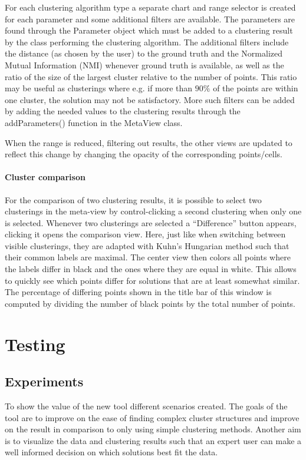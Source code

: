 \documentclass[
	a4paper,
	english,
	twoside,
	openright,               
	11pt                            
	]{report}
\begin{document}
For each clustering algorithm type a separate chart and range selector is created for each parameter and some additional filters are available. The parameters are found through the Parameter object which must be added to a clustering result by the class performing the clustering algorithm. The additional filters include the distance (as chosen by the user) to the ground truth and the Normalized Mutual Information (NMI) \cite{10.5555/1756006.1953024} whenever ground truth is available, as well as the ratio of the size of the largest cluster relative to the number of points. This ratio may be useful as clusterings where e.g. if more than $90\%$ of the points are within one cluster, the solution may not be satisfactory. More such filters can be added by adding the needed values to the clustering results through the addParameters() function in the MetaView class.

When the range is reduced, filtering out results, the other views are updated to reflect this change by changing the opacity of the corresponding points/cells.

\subsection{Cluster comparison}

For the comparison of two clustering results, it is possible to select two clusterings in the meta-view by control-clicking a second clustering when only one is selected. Whenever two clusterings are selected a ``Difference'' button appears, clicking it opens the comparison view. Here, just like when switching between visible clusterings, they are adapted with Kuhn’s Hungarian method \cite{Kuhn2010} such that their common labels are maximal. The center view then colors all points where the labels differ in black and the ones where they are equal in white. This allows to quickly see which points differ for solutions that are at least somewhat similar. The percentage of differing points shown in the title bar of this window is computed by dividing the number of black points by the total number of points.

\part{Testing}
\chapter{Experiments}\label{cha:experiments}
To show the value of the new tool different scenarios created. The goals of the tool are to improve on the ease of finding complex cluster structures and improve on the result in comparison to only using simple clustering methods. Another aim is to visualize the data and clustering results such that an expert user can make a well informed decision on which solutions best fit the data.
\end{document}
